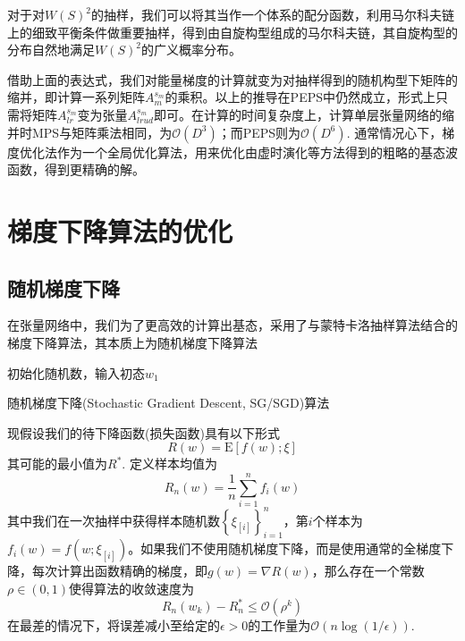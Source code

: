 对于对$W(S)^2$的抽样，我们可以将其当作一个体系的配分函数，利用马尔科夫链上的细致平衡条件做重要抽样，得到由自旋构型组成的马尔科夫链，其自旋构型的分布自然地满足$W(S)^2$的广义概率分布。

借助上面的表达式，我们对能量梯度的计算就变为对抽样得到的随机构型下矩阵的缩并，即计算一系列矩阵$A_m^{s_m}$的乘积。以上的推导在PEPS中仍然成立，形式上只需将矩阵$A^{s_m}_{lr}$变为张量$A^{s_m}_{lrud}$即可。在计算的时间复杂度上，计算单层张量网络的缩并时MPS与矩阵乘法相同，为$\mathcal{O}(D^3)$；而PEPS则为$\mathcal{O}(D^6)$. 通常情况心下，梯度优化法作为一个全局优化算法，用来优化由虚时演化等方法得到的粗略的基态波函数，得到更精确的解。

\section{梯度下降算法的优化}

\subsection{随机梯度下降}

在张量网络中，我们为了更高效的计算出基态，采用了与蒙特卡洛抽样算法结合的梯度下降算法，其本质上为随机梯度下降算法\cite[22]{bottouOptimizationMethodsLargeScale2018}
\begin{algorithm}[htb]
	
	
	初始化随机数，输入初态$w_1$\;
	\caption{随机梯度下降(Stochastic Gradient Descent, SG/SGD)算法}
	\label{algo:algorithm1}
\end{algorithm}

现假设我们的待下降函数(损失函数)具有以下形式
\begin{equation}\label{eq-sum-form}
R(w)=\mathrm{E}[f(w);\xi]
\end{equation}
其可能的最小值为$R^*$. 
定义样本均值为
\begin{equation}\label{key}
R_n(w)=\frac1n \sum_{i=1}^n f_i(w)
\end{equation}
其中我们在一次抽样中获得样本随机数$\left\{\xi_{[i]}\right\}_{i=1}^n$，第$i$个样本为$f_i(w)=f(w;\xi_{[i]})$。如果我们不使用随机梯度下降，而是使用通常的全梯度下降，每次计算出函数精确的梯度，即$g(w)=\nabla R(w)$，那么存在一个常数$\rho\in(0,1)$使得算法的收敛速度为
\begin{equation}\label{key}
R_n(w_k)-R_n^* \leq \mathcal{O}(\rho^k)
\end{equation}
在最差的情况下，将误差减小至给定的$\epsilon> 0$的工作量为$\mathcal{O}(n\log(1/\epsilon))$.

